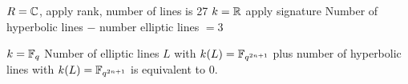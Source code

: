 $R= \mathbb{C}$, apply rank, number of lines is 27
$k= \mathbb{R}$ apply signature
Number of hyperbolic lines $-$ number elliptic lines $=3$

\begin{cor}
$k= \mathbb{F}_q$
Number of elliptic lines $L$ with $k(L)= \mathbb{F}_{q^{2n+1}}$ plus number of hyperbolic lines with $k(L)= \mathbb{F}_{q^{2n+1}}$ is equivalent to 0. 
\end{cor}




























